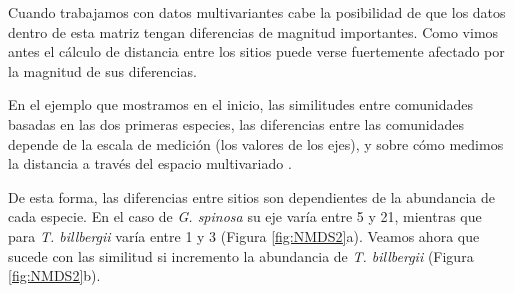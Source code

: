 \documentclass[]{book}
\newenvironment{Shaded}{\begin{snugshade}}{\end{snugshade}}
\newcommand{\KeywordTok}[1]{\textcolor[rgb]{0.13,0.29,0.53}{\textbf{{#1}}}}
\newcommand{\DataTypeTok}[1]{\textcolor[rgb]{0.13,0.29,0.53}{{#1}}}
\newcommand{\DecValTok}[1]{\textcolor[rgb]{0.00,0.00,0.81}{{#1}}}
\newcommand{\FloatTok}[1]{\textcolor[rgb]{0.00,0.00,0.81}{{#1}}}
\newcommand{\StringTok}[1]{\textcolor[rgb]{0.31,0.60,0.02}{{#1}}}
\newcommand{\NormalTok}[1]{{#1}}
\begin{document}
Cuando trabajamos con datos multivariantes cabe la posibilidad de que
los datos dentro de esta matriz tengan diferencias de magnitud
importantes. Como vimos antes el cálculo de distancia entre los sitios
puede verse fuertemente afectado por la magnitud de sus diferencias.

En el ejemplo que mostramos en el inicio, las similitudes entre
comunidades basadas en las dos primeras especies, las diferencias entre
las comunidades depende de la escala de medición (los valores de los
ejes), y sobre cómo medimos la distancia a través del espacio
multivariado \citep{Stevens2009}.

De esta forma, las diferencias entre sitios son dependientes de la
abundancia de cada especie. En el caso de \emph{G. spinosa} su eje varía
entre 5 y 21, mientras que para \emph{T. billbergii} varía entre 1 y 3
(Figura \ref{fig:NMDS2}a). Veamos ahora que sucede con las similitud si
incremento la abundancia de \emph{T. billbergii} (Figura
\ref{fig:NMDS2}b).

\begin{Shaded}
\end{Shaded}
\end{document}
